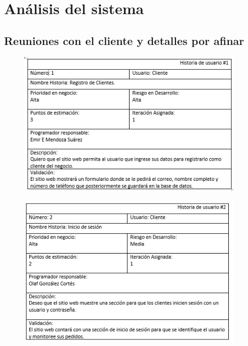 \section{Análisis del sistema}

\subsection{Reuniones con el cliente y detalles por afinar}


\begin{figure}[htb]
\begin{center}
\includegraphics[width=11cm]{./imagenes/tablas/HU1.png}
\end{center}

\end{figure}


\begin{figure}[htb]
\begin{center}
\includegraphics[width=11cm]{./imagenes/tablas/HU2.png}
\end{center}

\end{figure}

